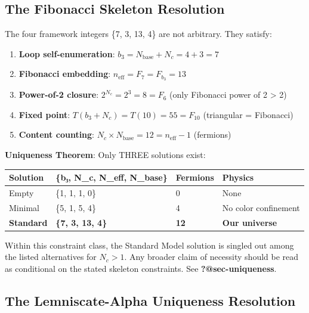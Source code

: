 \documentclass[
  11pt,
  letterpaper,
  twoside,
  openright]{book}
\providecommand{\tightlist}{%
  \setlength{\itemsep}{0pt}\setlength{\parskip}{0pt}}
\begin{document}
\subsection{The Fibonacci Skeleton
Resolution}\label{the-fibonacci-skeleton-resolution}

The four framework integers \{7, 3, 13, 4\} are not arbitrary. They
satisfy:

\begin{enumerate}
\def\labelenumi{\arabic{enumi}.}
\tightlist
\item
  \textbf{Loop self-enumeration}:
  \(b_3 = N_{\text{base}} + N_c = 4 + 3 = 7\)
\item
  \textbf{Fibonacci embedding}: \(n_{\text{eff}} = F_7 = F_{b_3} = 13\)
\item
  \textbf{Power-of-2 closure}: \(2^{N_c} = 2^3 = 8 = F_6\) (only
  Fibonacci power of 2 \textgreater{} 2)
\item
  \textbf{Fixed point}: \(T(b_3 + N_c) = T(10) = 55 = F_{10}\)
  (triangular = Fibonacci)
\item
  \textbf{Content counting}:
  \(N_c \times N_{\text{base}} = 12 = n_{\text{eff}} - 1\) (fermions)
\end{enumerate}

\textbf{Uniqueness Theorem}: Only THREE solutions exist:

\begin{longtable}[]{@{}llll@{}}
\toprule\noalign{}
Solution & \{b₃, N\_c, N\_eff, N\_base\} & Fermions & Physics \\
\midrule\noalign{}
\endhead
\bottomrule\noalign{}
\endlastfoot
Empty & \{1, 1, 1, 0\} & 0 & None \\
Minimal & \{5, 1, 5, 4\} & 4 & No color confinement \\
\textbf{Standard} & \textbf{\{7, 3, 13, 4\}} & \textbf{12} & \textbf{Our
universe} \\
\end{longtable}

Within this constraint class, the Standard Model solution is singled out
among the listed alternatives for \(N_c > 1\). Any broader claim of
necessity should be read as conditional on the stated skeleton
constraints. See \textbf{?@sec-uniqueness}.

\subsection{The Lemniscate-Alpha Uniqueness
Resolution}\label{the-lemniscate-alpha-uniqueness-resolution}
\end{document}
